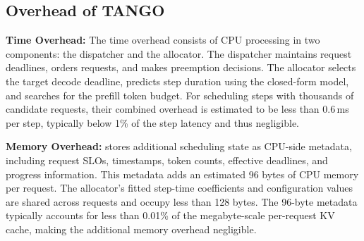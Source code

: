 \subsection{Overhead of TANGO}
\label{subsec:overhead-of-tango}

\textbf{Time Overhead:}
The time overhead consists of CPU processing in two components: the dispatcher and the allocator.
The dispatcher maintains request deadlines, orders requests, and makes preemption decisions.
The allocator selects the target decode deadline, predicts step duration using the closed-form model, and searches for the prefill token budget.
For scheduling steps with thousands of candidate requests, their combined overhead is estimated to be less than 0.6\,ms per step, typically below 1\% of the step latency and thus negligible.

\textbf{Memory Overhead:}
\tango{} stores additional scheduling state as CPU-side metadata, including request SLOs, timestamps, token counts, effective deadlines, and progress information.
This metadata adds an estimated 96 bytes of CPU memory per request.
The allocator's fitted step-time coefficients and configuration values are shared across requests and occupy less than 128 bytes.
The 96-byte metadata typically accounts for less than 0.01\% of the megabyte-scale per-request KV cache, making the additional memory overhead negligible.
